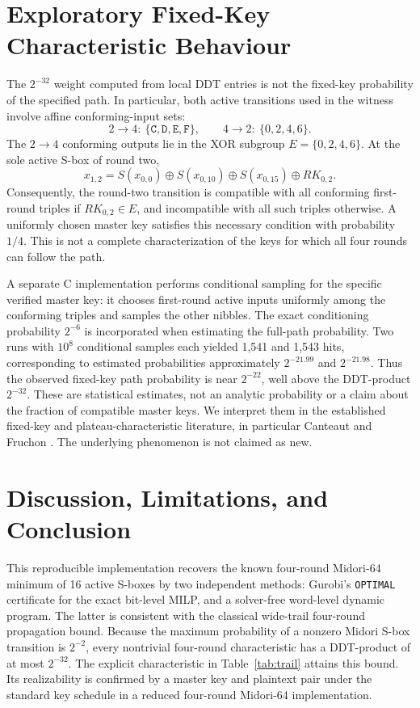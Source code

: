 \documentclass[11pt,a4paper]{article}
\begin{document}
\section{Exploratory Fixed-Key Characteristic Behaviour}
\label{sec:fixed-key}
The $2^{-32}$ weight computed from local DDT entries is not the
fixed-key probability of the specified path. In particular, both active
transitions used in the witness involve affine conforming-input sets:
\[
 2\to4:\ \{\mathtt C,\mathtt D,\mathtt E,\mathtt F\},\qquad
 4\to2:\ \{0,2,4,6\}.
\]
The $2\to4$ conforming outputs lie in the XOR subgroup
$E=\{0,2,4,6\}$. At the sole active S-box of round two,
\[
 x_{1,2}=S(x_{0,0})\oplus S(x_{0,10})\oplus
 S(x_{0,15})\oplus RK_{0,2}.
\]
Consequently, the round-two transition is compatible with all conforming
first-round triples if $RK_{0,2}\in E$, and incompatible with all such
triples otherwise. A uniformly chosen master key satisfies this necessary
condition with probability $1/4$. This is not a complete characterization
of the keys for which all four rounds can follow the path.

A separate C implementation performs conditional sampling for the
specific verified master key: it chooses first-round active inputs
uniformly among the conforming triples and samples the other nibbles.
The exact conditioning probability $2^{-6}$ is incorporated when
estimating the full-path probability. Two runs with $10^8$ conditional
samples each yielded 1,541 and 1,543 hits, corresponding to
estimated probabilities approximately $2^{-21.99}$ and $2^{-21.98}$.
Thus the observed fixed-key path probability is near $2^{-22}$,
well above the DDT-product $2^{-32}$. These are statistical estimates,
not an analytic probability or a claim about the fraction of compatible
master keys. We interpret them in the established fixed-key and
plateau-characteristic literature, in particular Canteaut and Fruchon
\cite{canteaut2025}. The underlying phenomenon is not claimed as new.

\section{Discussion, Limitations, and Conclusion}
This reproducible implementation recovers the known four-round Midori-64
minimum of 16 active S-boxes by two independent methods: Gurobi's
\texttt{OPTIMAL} certificate for the exact bit-level MILP, and a
solver-free word-level dynamic program. The latter is consistent with the
classical wide-trail four-round propagation bound. Because the maximum
probability of a nonzero Midori S-box transition is $2^{-2}$, every
nontrivial four-round characteristic has a DDT-product of at most
$2^{-32}$. The explicit characteristic in Table~\ref{tab:trail} attains
this bound. Its realizability is confirmed by a master key and plaintext
pair under the standard key schedule in a reduced four-round Midori-64
implementation.
\end{document}
